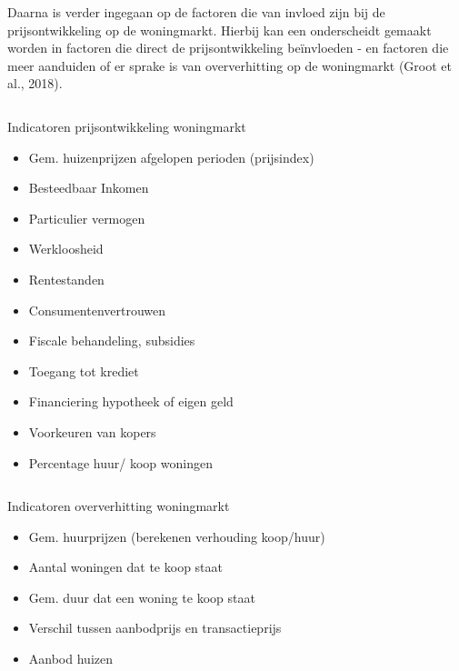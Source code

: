 \documentclass[
]{article}
\providecommand{\tightlist}{%
  \setlength{\itemsep}{0pt}\setlength{\parskip}{0pt}}
\begin{document}
\newline

Daarna is verder ingegaan op de factoren die van invloed zijn bij de
prijsontwikkeling op de woningmarkt. Hierbij kan een onderscheidt
gemaakt worden in factoren die direct de prijsontwikkeling beïnvloeden -
en factoren die meer aanduiden of er sprake is van oververhitting op de
woningmarkt (Groot et al., 2018).

\begin{column}{0.48\textwidth}

Indicatoren prijsontwikkeling woningmarkt

\begin{itemize}
\tightlist
\item
  Gem. huizenprijzen afgelopen perioden (prijsindex)
\item
  Besteedbaar Inkomen
\item
  Particulier vermogen
\item
  Werkloosheid
\item
  Rentestanden
\item
  Consumentenvertrouwen
\item
  Fiscale behandeling, subsidies
\item
  Toegang tot krediet
\item
  Financiering hypotheek of eigen geld
\item
  Voorkeuren van kopers
\item
  Percentage huur/ koop woningen
\end{itemize}


\end{column}

\begin{column}{0.48\textwidth}

Indicatoren oververhitting woningmarkt

\begin{itemize}
\tightlist
\item
  Gem. huurprijzen (berekenen verhouding koop/huur)
\item
  Aantal woningen dat te koop staat
\item
  Gem. duur dat een woning te koop staat
\item
  Verschil tussen aanbodprijs en transactieprijs
\item
  Aanbod huizen
\end{itemize}


\end{column}

\newline
\end{document}
